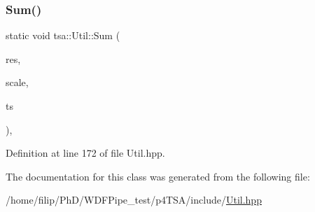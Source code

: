 \subsubsection{\texorpdfstring{Sum()}{Sum()}}
{\footnotesize\ttfamily static void tsa\+::\+Util\+::\+Sum (\begin{DoxyParamCaption}\item[{\hyperlink{namespacetsa_ac599574bcc094eda25613724b8f3ca9e}{Seq\+View\+Double} \&}]{res,  }\item[{double}]{scale,  }\item[{\hyperlink{namespacetsa_ac599574bcc094eda25613724b8f3ca9e}{Seq\+View\+Double} \&}]{ts }\end{DoxyParamCaption})\hspace{0.3cm}{\ttfamily [inline]}, {\ttfamily [static]}}



Definition at line 172 of file Util.\+hpp.



The documentation for this class was generated from the following file\+:\begin{DoxyCompactItemize}
\item 
/home/filip/\+Ph\+D/\+W\+D\+F\+Pipe\+\_\+test/p4\+T\+S\+A/include/\hyperlink{_util_8hpp}{Util.\+hpp}\end{DoxyCompactItemize}
